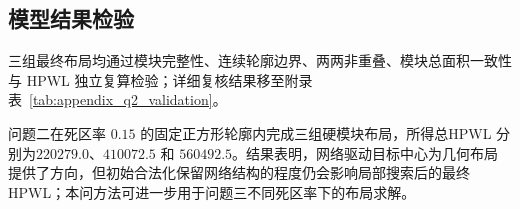 \subsection{模型结果检验}

三组最终布局均通过模块完整性、连续轮廓边界、两两非重叠、模块总面积一致性与 HPWL 独立复算检验；详细复核结果移至附录表~\ref{tab:appendix_q2_validation}。

问题二在死区率 $0.15$ 的固定正方形轮廓内完成三组硬模块布局，所得总\allowbreak HPWL 分别为\allowbreak $220279.0$、$410072.5$ 和 $560492.5$。结果表明，网络驱动目标中心为几何布局提供了方向，但初始合法化保留网络结构的程度仍会影响局部搜索后的最终 HPWL；本问方法可进一步用于问题三不同死区率下的布局求解。
